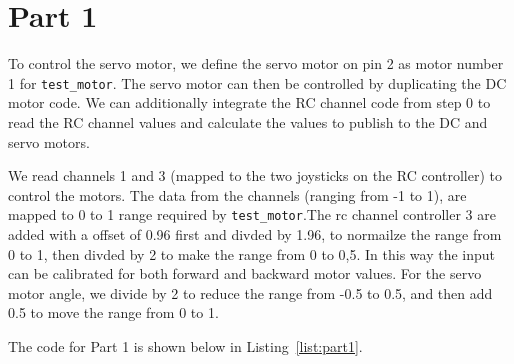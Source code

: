 \begin{filecontents}[overwrite]{./sections/part1_list.tex}
        test_motor_pub.publish(servo_motor);

        px4_usleep(20000);
    }

    PX4_INFO("The motor will be stopped");
    test_motor.timestamp = hrt_absolute_time();
    test_motor.motor_number = DC_MOTOR;
    test_motor.value = 0.5;
    test_motor.driver_instance = 0;
    test_motor.timeout_ms = 0;

    test_motor_pub.publish(test_motor);

    PX4_INFO("The servo motor will be stopped");
    servo_motor.timestamp = hrt_absolute_time();
    servo_motor.motor_number = SERVO_MOTOR;
    servo_motor.value = 0.5;
    servo_motor.driver_instance = 0;
    servo_motor.timeout_ms = 0;

    test_motor_pub.publish(servo_motor);

    return 0;
}
\end{lstlisting}
\end{filecontents}

\section*{Part 1}

To control the servo motor, we define the servo motor on pin 2 as motor number 1 for \texttt{test\_motor}. The servo motor can then be controlled by duplicating the DC motor code. We can additionally integrate the RC channel code from step 0 to read the RC channel values and calculate the values to publish to the DC and servo motors.

We read channels 1 and 3 (mapped to the two joysticks on the RC controller) to control the motors. The data from the channels (ranging from -1 to 1), are mapped to 0 to 1 range required by \texttt{test\_motor}.The rc channel controller 3 are added with a offset of 0.96 first and divded by 1.96, to normailze the range from 0 to 1, then divded by 2 to make the range from 0 to 0,5. In this way the input can be calibrated for both forward and backward motor values. For the servo motor angle, we divide by 2 to reduce the range from -0.5 to 0.5, and then add 0.5 to move the range from 0 to 1.

The code for Part 1 is shown below in Listing~\ref{list:part1}.


